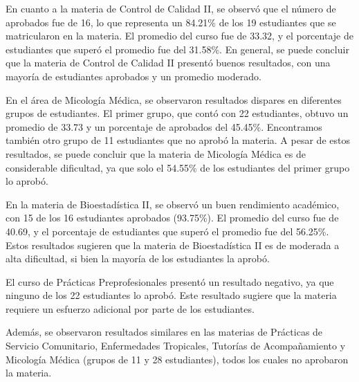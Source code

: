 En cuanto a la materia de Control de Calidad II, se observó que el número de aprobados fue de 16, lo que representa un 84.21\% de los 19 estudiantes que se matricularon en la materia. El promedio del curso fue de 33.32, y el porcentaje de estudiantes que superó el promedio fue del 31.58\%. En general, se puede concluir que la materia de Control de Calidad II presentó buenos resultados, con una mayoría de estudiantes aprobados y un promedio moderado.

En el área de Micología Médica, se observaron resultados dispares en diferentes grupos de estudiantes. El primer grupo, que contó con 22 estudiantes, obtuvo un promedio de 33.73 y un porcentaje de aprobados del 45.45\%. Encontramos también otro grupo de 11 estudiantes que no aprobó la materia. A pesar de estos resultados, se puede concluir que la materia de Micología Médica es de considerable dificultad, ya que solo el 54.55\% de los estudiantes del primer grupo lo aprobó.

En la materia de Bioestadística II, se observó un buen rendimiento académico, con 15 de los 16 estudiantes aprobados (93.75\%). El promedio del curso fue de 40.69, y el porcentaje de estudiantes que superó el promedio fue del 56.25\%. Estos resultados sugieren que la materia de Bioestadística II es de moderada a alta dificultad, si bien la mayoría de los estudiantes la aprobó.

El curso de Prácticas Preprofesionales presentó un resultado negativo, ya que ninguno de los 22 estudiantes lo aprobó. Este resultado sugiere que la materia requiere un esfuerzo adicional por parte de los estudiantes.

Además, se observaron resultados similares en las materias de Prácticas de Servicio Comunitario, Enfermedades Tropicales, Tutorías de Acompañamiento y Micología Médica (grupos de 11 y 28 estudiantes), todos los cuales no aprobaron la materia.

